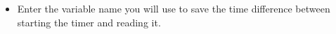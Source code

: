 
\begin{itemize}
\item Enter the variable name you will use to save the time difference between starting the timer and reading it. 
\end{itemize}
